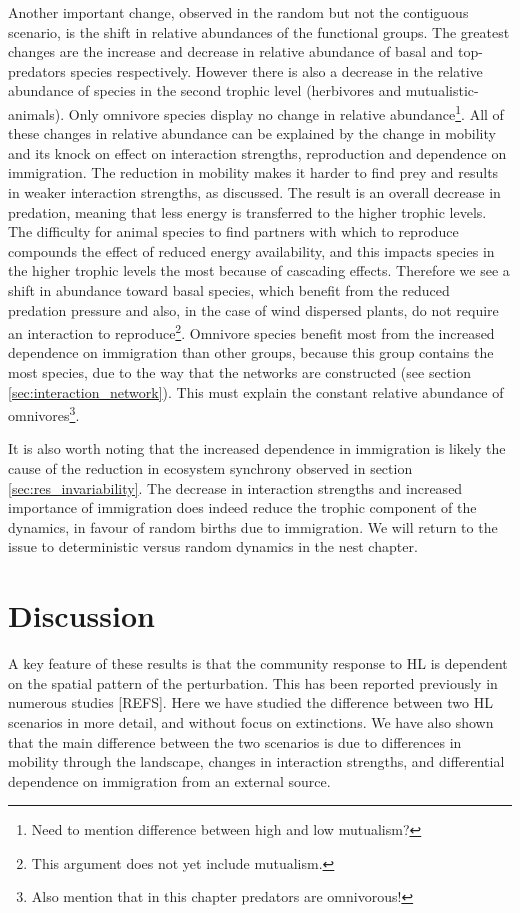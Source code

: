 Another important change, observed in the random but not the contiguous scenario, is the shift in relative abundances of the functional groups. The greatest changes are the increase and decrease in relative abundance of basal and top-predators species respectively. However there is also a decrease in the relative abundance of species in the second trophic level (herbivores and mutualistic-animals). Only omnivore species display no change in relative abundance\footnote{Need to mention difference between high and low mutualism?}. All of these changes in relative abundance can be explained by the change in mobility and its knock on effect on interaction strengths, reproduction and dependence on immigration. The reduction in mobility makes it harder to find prey and results in weaker interaction strengths, as discussed. The result is an overall decrease in predation, meaning that less energy is transferred to the higher trophic levels. The difficulty for animal species to find partners with which to reproduce compounds the effect of reduced energy availability, and this impacts species in the higher trophic levels the most because of cascading effects. Therefore we see a shift in abundance toward basal species, which benefit from the reduced predation pressure and also, in the case of wind dispersed plants, do not require an interaction to reproduce\footnote{This argument does not yet include mutualism.}. Omnivore species benefit most from the increased dependence on immigration than other groups, because this group contains the most species, due to the way that the networks are constructed (see section \ref{sec:interaction_network}). This must explain the constant relative abundance of omnivores\footnote{Also mention that in this chapter predators are omnivorous!}.

It is also worth noting that the increased dependence in immigration is likely the cause of the reduction in ecosystem synchrony observed in section \ref{sec:res_invariability}. The decrease in interaction strengths and increased importance of immigration does indeed reduce the trophic component of the dynamics, in favour of random births due to immigration. We will return to the issue to deterministic versus random dynamics in the nest chapter. 


\clearpage
\section{Discussion}
\label{sec:discussion}

A key feature of these results is that the community response to HL is dependent on the spatial pattern of the perturbation. This has been reported previously in numerous studies [REFS]. Here we have studied the difference between two HL scenarios in more detail, and without focus on extinctions. We have also shown that the main difference between the two scenarios is due to differences in mobility through the landscape, changes in interaction strengths, and differential dependence on immigration from an external source. 

